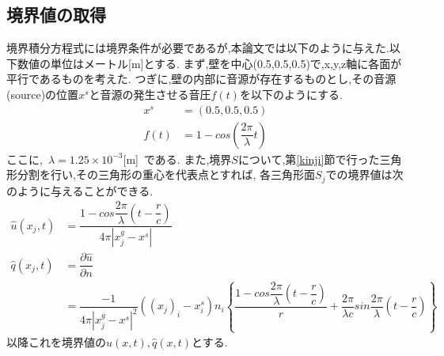 \documentclass[dvipdfmx]{ampbt}
\begin{document}
\subsection{境界値の取得}
\label{境界値の取得}
境界積分方程式には境界条件が必要であるが,本論文では以下のように与えた.以下数値の単位はメートル[m]とする.
まず,壁を中心(0.5,0.5,0.5)で,x,y,z軸に各面が平行であるものを考えた.
つぎに,壁の内部に音源が存在するものとし,その音源(source)の位置$x^s$と音源の発生させる音圧$f(t)$を以下のようにする.
\begin{align}
x^s &= (0.5,0.5,0.5)\\
\label{ef:f(t)}
f(t) &= 1-cos(\dfrac{2 \pi}{\lambda}t)
\end{align}
ここに,\ $\lambda = 1.25 \times 10^{-3}$[m]\ である.
また,境界$S$について,第\ref{kinji}節で行った三角形分割を行い,その三角形の重心を代表点とすれば,
各三角形面$S_j$での境界値は次のように与えることができる.
\begin{align}
\hat{u}(x_j,t) &= \dfrac{1-cos\dfrac{2 \pi}{\lambda}(t-\dfrac{r}{c})}{4\pi|x^g_j-x^s|} \\
\hat{q}(x_j,t) &= \dfrac{\partial \hat{u}}{\partial n} \nonumber \\
               &= \dfrac{-1}{4\pi|x^g_j-x^s|^2}((x_j)_i-x^s_i)n_i \left\{ \dfrac{1-cos\dfrac{2 \pi}{\lambda}(t-\dfrac{r}{c})}{r} + \dfrac{2\pi}{\lambda c} sin\dfrac{2\pi}{\lambda}(t-\dfrac{r}{c})  \right\}
\end{align}
以降これを境界値の$\hat{u}(x,t),\hat{q}(x,t)$とする.
\end{document}
